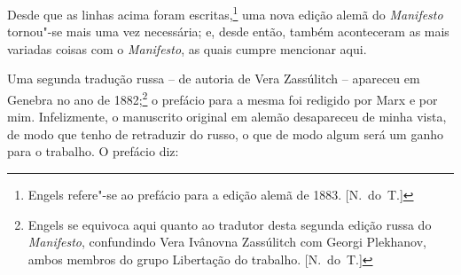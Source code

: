 Desde que as linhas acima foram escritas,\footnote{ Engels refere"-se
ao prefácio para a edição alemã de 1883. [N.~do~T.]}  uma nova
edição alemã do \textit{Manifesto} tornou"-se mais uma vez necessária;
e, desde então, também aconteceram as mais variadas coisas com o
\textit{Manifesto}, as quais cumpre mencionar aqui. 

Uma segunda tradução russa – de autoria de Vera Zassúlitch – apareceu
em Genebra no ano de 1882;\footnote{ Engels se equivoca aqui quanto ao
tradutor desta segunda edição russa do \textit{Manifesto}, confundindo
Vera Ivânovna Zassúlitch com Georgi Plekhanov, ambos membros do grupo
Libertação do trabalho. [N.~do~T.]}  o prefácio para a
mesma foi redigido por Marx e por mim. Infelizmente, o manuscrito
original em alemão desapareceu de minha vista, de modo que tenho de
retraduzir do russo, o que de modo algum será um ganho para o trabalho.
O prefácio diz:

